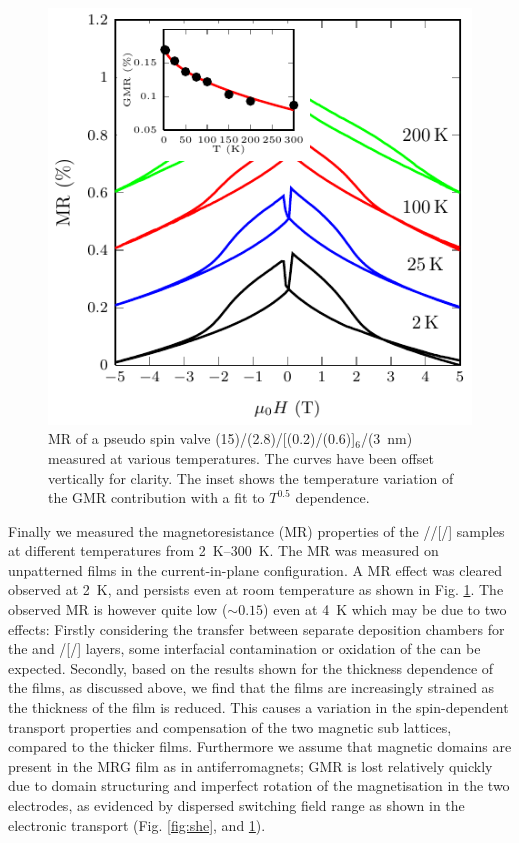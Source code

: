 \documentclass[reprint,aip,apl,floatfix,linenumbers,superscriptaddress]{revtex4-1}
\begin{document}
\begin{figure}
\includegraphics[width=1.0\columnwidth]{Transport-Fig5.pdf}
\caption{MR of a pseudo spin valve (15)/(2.8)/[(0.2)/(0.6)]$_6$/(\SI{3}{\nano\metre})  measured at various temperatures. The curves have been offset vertically for clarity.  The inset shows the temperature variation of the GMR contribution with a fit to $T^{0.5}$ dependence.}
\label{fig:gmr}
\end{figure}

Finally we measured the magnetoresistance (MR) properties of the //[/] samples at different temperatures from \SIrange{2}{300}{\kelvin}. The MR was measured on unpatterned films in the current-in-plane configuration. A MR effect was cleared observed at \SI{2}{\kelvin}, and persists even at room temperature as shown in Fig. \ref{fig:gmr}. The observed MR is however quite low ($\sim \num{0.15}$) even at \SI{4}{\kelvin} which may be due to two effects: Firstly considering the transfer between separate deposition chambers for the  and /[/] layers, some interfacial contamination or oxidation of the  can be expected.  Secondly, based on the results shown for the thickness dependence of the  films, as discussed above, we find that the films are increasingly strained as the thickness of the film is reduced. This causes a variation in the spin-dependent transport properties and compensation of the two magnetic sub lattices, compared to the thicker films. Furthermore we assume that magnetic domains are present in the MRG film as in antiferromagnets; GMR is lost relatively quickly due to domain structuring and imperfect rotation of the magnetisation in the two electrodes, as evidenced by dispersed switching field range as shown in the electronic transport (Fig. \ref{fig:she}, and \ref{fig:gmr}).
\end{document}
